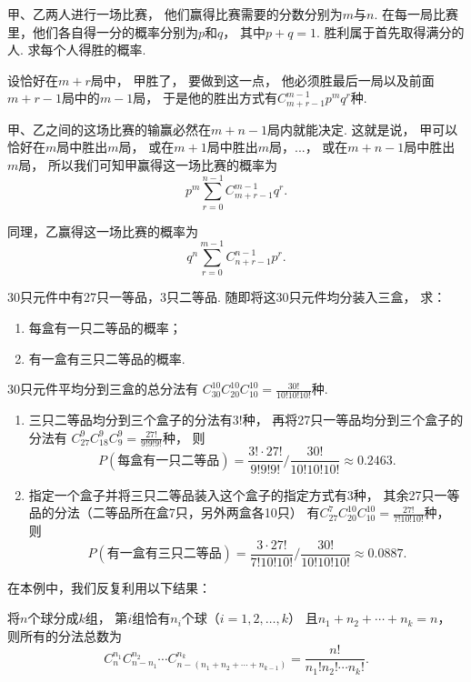 \begin{example}[得分问题]
甲、乙两人进行一场比赛，
他们赢得比赛需要的分数分别为\(m\)与\(n\).
在每一局比赛里，他们各自得一分的概率分别为\(p\)和\(q\)，
其中\(p+q=1\).
胜利属于首先取得满分的人.
求每个人得胜的概率.
\begin{solution}
设恰好在\(m+r\)局中，
甲胜了，
要做到这一点，
他必须胜最后一局以及前面\(m+r-1\)局中的\(m-1\)局，
于是他的胜出方式有\(C_{m+r-1}^{m-1} p^m q^r\)种.

甲、乙之间的这场比赛的输赢必然在\(m+n-1\)局内就能决定.
这就是说，
甲可以恰好在\(m\)局中胜出\(m\)局，
或在\(m+1\)局中胜出\(m\)局，...，
或在\(m+n-1\)局中胜出\(m\)局，
所以我们可知甲赢得这一场比赛的概率为\begin{equation*}
	p^m \sum_{r=0}^{n-1} C_{m+r-1}^{m-1} q^r.
\end{equation*}

同理，乙赢得这一场比赛的概率为\begin{equation*}
	q^n \sum_{r=0}^{m-1} C_{n+r-1}^{n-1} p^r.
\end{equation*}
\end{solution}
\end{example}

\begin{example}
30只元件中有27只一等品，3只二等品.
随即将这30只元件均分装入三盒，
求：\begin{enumerate}
	\item 每盒有一只二等品的概率；
	\item 有一盒有三只二等品的概率.
\end{enumerate}
\begin{solution}
30只元件平均分到三盒的总分法有
\(C_{30}^{10} C_{20}^{10} C_{10}^{10} = \frac{30!}{10! 10! 10!}\)种.
\begin{enumerate}
	\item 三只二等品均分到三个盒子的分法有\(3!\)种，
	再将27只一等品均分到三个盒子的分法有
	\(C_{27}^9 C_{18}^9 C_9^9 = \frac{27!}{9! 9! 9!}\)种，
	则\begin{equation*}
		P(\text{每盒有一只二等品})
		=\frac{3! \cdot 27!}{9! 9! 9!} \bigg/ \frac{30!}{10! 10! 10!} \approx 0.2463.
	\end{equation*}

	\item 指定一个盒子并将三只二等品装入这个盒子的指定方式有\(3\)种，
	其余27只一等品的分法（二等品所在盒7只，另外两盒各10只）
	有\(C_{27}^7 C_{20}^{10} C_{10}^{10} = \frac{27!}{7! 10! 10!}\)种，
	则\begin{equation*}
		P(\text{有一盒有三只二等品})
		= \frac{3 \cdot 27!}{7! 10! 10!} \bigg/ \frac{30!}{10! 10! 10!} \approx 0.0887.
	\end{equation*}
\end{enumerate}
\end{solution}
在本例中，我们反复利用以下结果：

将\(n\)个球分成\(k\)组，
第\(i\)组恰有\(n_i\)个球（\(i=1,2,\dotsc,k\)）
且\(n_1+n_2+\dotsb+n_k=n\)，
则所有的分法总数为\begin{equation}
	C_n^{n_1} C_{n-n_1}^{n_2} \dotsm C_{n-(n_1+n_2+\dotsb+n_{k-1})}^{n_k}
	= \frac{n!}{n_1! n_2! \dotsm n_k!}.
\end{equation}
\end{example}

